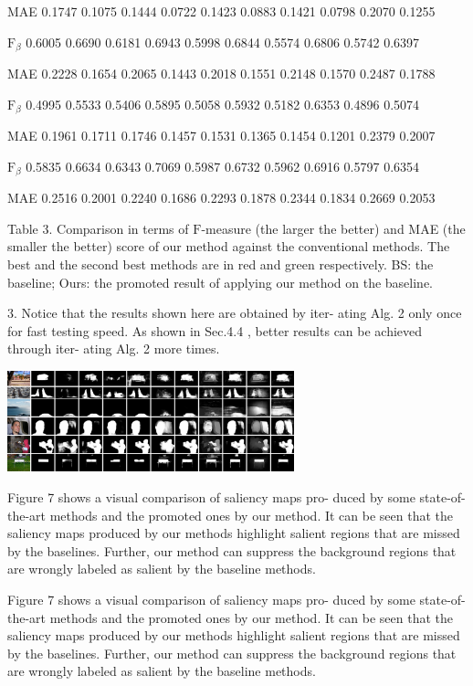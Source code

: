 \documentclass[a4paper,10pt]{article}
\begin{document}
MAE 0.1747 0.1075 0.1444 0.0722 0.1423 0.0883 0.1421 0.0798 0.2070 0.1255

$\mathrm{F}_{\beta}$ 0.6005 0.6690 0.6181 0.6943 0.5998 0.6844 0.5574 0.6806 0.5742 0.6397

MAE 0.2228 0.1654 0.2065 0.1443 0.2018 0.1551 0.2148 0.1570 0.2487 0.1788

$\mathrm{F}_{\beta}$ 0.4995 0.5533 0.5406 0.5895 0.5058 0.5932 0.5182 0.6353 0.4896 0.5074

MAE 0.1961 0.1711 0.1746 0.1457 0.1531 0.1365 0.1454 0.1201 0.2379 0.2007

$\mathrm{F}_{\beta}$ 0.5835 0.6634 0.6343 0.7069 0.5987 0.6732 0.5962 0.6916 0.5797 0.6354

MAE 0.2516 0.2001 0.2240 0.1686 0.2293 0.1878 0.2344 0.1834 0.2669 0.2053

Table 3. Comparison in terms of $\mathrm{F}$-measure (the larger the better) and MAE (the smaller the better) score of our method against the conventional methods. The best and the second best methods are in red and green respectively. BS: the baseline; Ours: the promoted result of applying our method on the baseline.

3. Notice that the results shown here are obtained by iter- ating Alg. 2 only once for fast testing speed. As shown in Sec.4.4 , better results can be achieved through iter- ating Alg. 2 more times.
\begin{center}
\includegraphics[width=83.02mm,height=29.25mm]{./zengyu_images/image020.eps}
\end{center}
Figure 7 shows a visual comparison of saliency maps pro- duced by some state-of-the-art methods and the promoted ones by our method. It can be seen that the saliency maps produced by our methods highlight salient regions that are missed by the baselines. Further, our method can suppress the background regions that are wrongly labeled as salient by the baseline methods.

Figure 7 shows a visual comparison of saliency maps pro- duced by some state-of-the-art methods and the promoted ones by our method. It can be seen that the saliency maps produced by our methods highlight salient regions that are missed by the baselines. Further, our method can suppress the background regions that are wrongly labeled as salient by the baseline methods.
\end{document}
